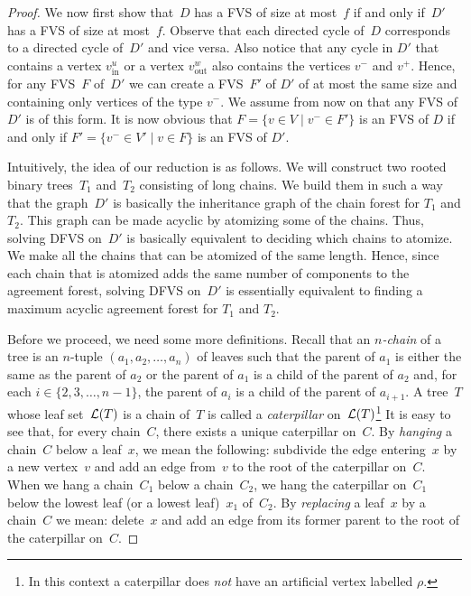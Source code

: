 \begin{proof}
We now first show that~$D$ has a FVS of size at most~$f$ if and only if~$D'$ has a FVS of size at most~$f$. Observe that each directed cycle of~$D$ corresponds to a directed cycle of~$D'$ and vice versa. Also notice that any cycle in $D'$ that contains a vertex $v_{\text{in}}^{u}$ or a vertex $v_{\text{out}}^{w}$ also contains the vertices $v^-$ and $v^+$. Hence, for any FVS~$F$ of~$D'$ we can create a FVS~$F'$ of $D'$ of at most the same size and containing only vertices of the type $v^-$. We assume from now on that any FVS of $D'$ is of this form. It is now obvious that $F= \{ v\in V \mid v^- \in F'\} $ is an FVS of $D$ if and only if $F'= \{ v^-\in V' \mid v \in F\} $ is an FVS of $D'$.

Intuitively, the idea of our reduction is as follows. We will construct two rooted binary trees~$T_1$ and~$T_2$ consisting of long chains. We build them in such a way that the graph~$D'$ is basically the inheritance graph of the chain forest for $T_1$ and $T_2$. This graph can be made acyclic by atomizing some of the chains. Thus, solving {\sc DFVS} on~$D'$ is basically equivalent to deciding which chains to atomize. We make all the chains that can be atomized of the same length. Hence, since each chain that is atomized adds the same number of components to the agreement forest, solving {\sc DFVS} on~$D'$ is essentially equivalent to finding a maximum acyclic agreement forest for $T_1$ and $T_2$.

Before we proceed, we need some more definitions. Recall that an {\it $n$-chain} of a tree is an $n$-tuple $(a_1,a_2,\ldots,a_n)$ of leaves such that the parent of $a_1$ is either the same as the parent of $a_2$ or the parent of $a_1$ is a child of the parent of $a_2$ and, for each $i\in\{2,3,\ldots,n-1\}$, the parent of $a_i$ is a child of the parent of $a_{i+1}$. A tree~$T$ whose leaf set~${\mathcal L}(T)$ is a chain of~$T$ is called a \emph{caterpillar} on~${\mathcal L}(T)$\footnote{{In this context a caterpillar does \emph{not} have an artificial vertex labelled $\rho$.}} It is easy to see that, for every chain~$C$, there exists a unique caterpillar on~$C$.  By \emph{hanging} a chain~$C$ below a leaf~$x$, we mean the following: subdivide the edge entering~$x$ by a new vertex~$v$ and add an edge from~$v$ to the root of the caterpillar on~$C$. When we hang a chain~$C_1$ below a chain~$C_2$, we hang the caterpillar on~$C_1$ below the lowest leaf (or a lowest leaf)~$x_1$ of~$C_2$. By \emph{replacing} a leaf~$x$ by a 
chain~$C$ we mean: delete~$x$ and add an edge from its former parent to the root of the caterpillar on~$C$.


\end{proof}
